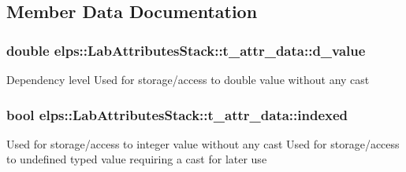 \subsection{Member Data Documentation}
\hypertarget{structelps_1_1_lab_attributes_stack_1_1t__attr__data_a19980f86ba84b14f9cdddca2b041d754}{
\subsubsection[{d\-\_\-value}]{\setlength{\rightskip}{0pt plus 5cm}double elps\-::\-Lab\-Attributes\-Stack\-::t\-\_\-attr\-\_\-data\-::d\-\_\-value}}\label{structelps_1_1_lab_attributes_stack_1_1t__attr__data_a19980f86ba84b14f9cdddca2b041d754}
Dependency level Used for storage/access to double value without any cast \hypertarget{structelps_1_1_lab_attributes_stack_1_1t__attr__data_aa85d8c64cdfc9b5e62e64903efa96d7b}{
\subsubsection[{indexed}]{\setlength{\rightskip}{0pt plus 5cm}bool elps\-::\-Lab\-Attributes\-Stack\-::t\-\_\-attr\-\_\-data\-::indexed}}\label{structelps_1_1_lab_attributes_stack_1_1t__attr__data_aa85d8c64cdfc9b5e62e64903efa96d7b}
Used for storage/access to integer value without any cast Used for storage/access to undefined typed value requiring a cast for later use 